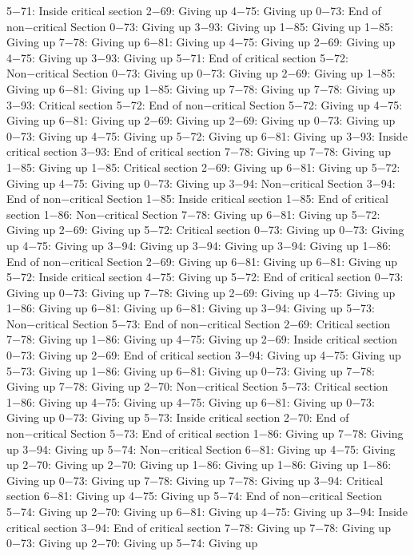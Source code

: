 5−71: Inside critical section
2−69: Giving up
4−75: Giving up
0−73: End of non−critical Section
0−73: Giving up
3−93: Giving up
1−85: Giving up
1−85: Giving up
7−78: Giving up
6−81: Giving up
4−75: Giving up
2−69: Giving up
4−75: Giving up
3−93: Giving up
5−71: End of critical section
5−72: Non−critical Section
0−73: Giving up
0−73: Giving up
2−69: Giving up
1−85: Giving up
6−81: Giving up
1−85: Giving up
7−78: Giving up
7−78: Giving up
3−93: Critical section
5−72: End of non−critical Section
5−72: Giving up
4−75: Giving up
6−81: Giving up
2−69: Giving up
2−69: Giving up
0−73: Giving up
0−73: Giving up
4−75: Giving up
5−72: Giving up
6−81: Giving up
3−93: Inside critical section
3−93: End of critical section
7−78: Giving up
7−78: Giving up
1−85: Giving up
1−85: Critical section
2−69: Giving up
6−81: Giving up
5−72: Giving up
4−75: Giving up
0−73: Giving up
3−94: Non−critical Section
3−94: End of non−critical Section
1−85: Inside critical section
1−85: End of critical section
1−86: Non−critical Section
7−78: Giving up
6−81: Giving up
5−72: Giving up
2−69: Giving up
5−72: Critical section
0−73: Giving up
0−73: Giving up
4−75: Giving up
3−94: Giving up
3−94: Giving up
3−94: Giving up
1−86: End of non−critical Section
2−69: Giving up
6−81: Giving up
6−81: Giving up
5−72: Inside critical section
4−75: Giving up
5−72: End of critical section
0−73: Giving up
0−73: Giving up
7−78: Giving up
2−69: Giving up
4−75: Giving up
1−86: Giving up
6−81: Giving up
6−81: Giving up
3−94: Giving up
5−73: Non−critical Section
5−73: End of non−critical Section
2−69: Critical section
7−78: Giving up
1−86: Giving up
4−75: Giving up
2−69: Inside critical section
0−73: Giving up
2−69: End of critical section
3−94: Giving up
4−75: Giving up
5−73: Giving up
1−86: Giving up
6−81: Giving up
0−73: Giving up
7−78: Giving up
7−78: Giving up
2−70: Non−critical Section
5−73: Critical section
1−86: Giving up
4−75: Giving up
4−75: Giving up
6−81: Giving up
0−73: Giving up
0−73: Giving up
5−73: Inside critical section
2−70: End of non−critical Section
5−73: End of critical section
1−86: Giving up
7−78: Giving up
3−94: Giving up
5−74: Non−critical Section
6−81: Giving up
4−75: Giving up
2−70: Giving up
2−70: Giving up
1−86: Giving up
1−86: Giving up
1−86: Giving up
0−73: Giving up
7−78: Giving up
7−78: Giving up
3−94: Critical section
6−81: Giving up
4−75: Giving up
5−74: End of non−critical Section
5−74: Giving up
2−70: Giving up
6−81: Giving up
4−75: Giving up
3−94: Inside critical section
3−94: End of critical section
7−78: Giving up
7−78: Giving up
0−73: Giving up
2−70: Giving up
5−74: Giving up

